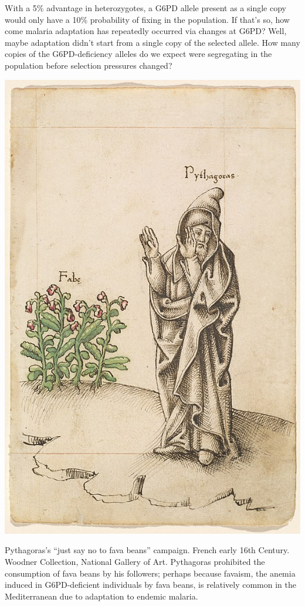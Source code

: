 {With a 5\% advantage in heterozygotes, a G6PD allele present as a
single copy would only have a 10\% probability of
fixing in the population. If that's so, how come malaria adaptation has
repeatedly occurred via changes at G6PD? Well, maybe adaptation didn't
start from a single copy of the selected allele. How many copies of
the G6PD-deficiency alleles do we expect were segregating in the population before
selection pressures changed? 
\begin{marginfigure}
\begin{center}
  \includegraphics[width=\textwidth]{illustration_images/Genetic_drift_selection/Pythagoras_fava_beans/586px-Do_Not_Eat_Beans.jpg}
\caption{
Pythagoras's ``just say no to fava beans'' campaign. French early 16th Century. Woodner Collection, National Gallery of Art.
Pythagoras prohibited the consumption of fava beans by his followers; perhaps because favaism, the anemia induced in G6PD-deficient
individuals by fava beans, is relatively common in the Mediterranean due
to adaptation to endemic malaria. } \label{fig:fava}
\end{center}
\end{marginfigure}

}
